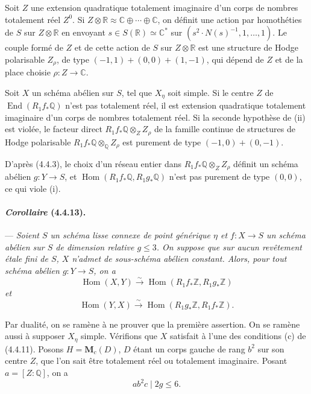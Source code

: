 \documentclass[10pt]{article}
\newcommand{\C}{\mathbb C}
\newcommand{\Q}{\mathbb Q}
\newcommand{\Z}{\mathbb Z}
\newcommand{\Hom}{\operatorname{Hom}}
\newcommand{\iso}{\xrightarrow{\sim}}
\newcommand{\R}{\mathbb R}
\providecommand{\End}{\operatorname{End}}
\begin{document}
Soit $Z$ une extension quadratique totalement imaginaire d'un corps de nombres totalement réel $Z^0$. Si $Z\otimes\R\approx \C\oplus\cdots\oplus\C$, on définit une action par homothéties de $S$ sur $Z\otimes\R$ en envoyant $s\in S(\R)\simeq\C^*$ sur $(s^2\cdot N(s)^{-1},1,\ldots,1)$. Le couple formé de $Z$ et de cette action de $S$ sur $Z\otimes\R$ est une structure de Hodge polarisable $Z_\rho$, de type $(-1,1)+(0,0)+(1,-1)$, qui dépend de $Z$ et de la place choisie $\rho:Z\to\C$.

Soit $X$ un schéma abélien sur $S$, tel que $X_\eta$ soit simple. Si le centre $Z$ de $\End(R_1f_*\Q)$ n'est pas totalement réel, il est extension quadratique totalement imaginaire d'un corps de nombres totalement réel. Si la seconde hypothèse de (ii) est violée, le facteur direct $R_1f_*\Q\otimes_Z Z_\rho$ de la famille continue de structures de Hodge polarisable $R_1f_*\Q\otimes_\Q Z_\rho$ est purement de type $(-1,0)+(0,-1)$.

D'après (4.4.3), le choix d'un réseau entier dans $R_1f_*\Q\otimes_Z Z_\rho$ définit un schéma abélien $g:Y\to S$, et $\Hom(R_1f_*\Q,R_1g_*\Q)$ n'est pas purement de type $(0,0)$, ce qui viole (i).

\paragraph{\emph{Corollaire} (4.4.13).} --- {\itshape Soient $S$ un schéma lisse connexe de point générique $\eta$ et $f:X\to S$ un schéma abélien sur $S$ de dimension relative $g\le3$. On suppose que sur aucun revêtement étale fini de $S$, $X$ n'admet de sous-schéma abélien constant. Alors, pour tout schéma abélien $g:Y\to S$, on a
\[
\Hom(X,Y)\iso \Hom(R_1f_*\Z,R_1g_*\Z)
\]
et
\[
\Hom(Y,X)\iso \Hom(R_1g_*\Z,R_1f_*\Z).
\]}

Par dualité, on se ramène à ne prouver que la première assertion. On se ramène aussi à supposer $X_\eta$ simple. Vérifions que $X$ satisfait à l'une des conditions (c) de (4.4.11). Posons $H=\mathbf{M}_c(D)$, $D$ étant un corps gauche de rang $b^2$ sur son centre $Z$, que l'on sait être totalement réel ou totalement imaginaire. Posant $a=[Z:\Q]$, on a
\[
\tag{4.4.13.1}
ab^2c\mid 2g\le6.
\]

\end{document}
